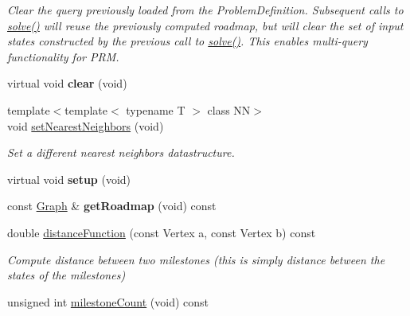 \begin{DoxyCompactItemize}
\begin{DoxyCompactList}\small\item\em \-Clear the query previously loaded from the \-Problem\-Definition. \-Subsequent calls to \hyperlink{class_f_i_r_m_a02f3c98de4840594193ba5bf7ff3ca63}{solve()} will reuse the previously computed roadmap, but will clear the set of input states constructed by the previous call to \hyperlink{class_f_i_r_m_a02f3c98de4840594193ba5bf7ff3ca63}{solve()}. \-This enables multi-\/query functionality for \-P\-R\-M. \end{DoxyCompactList}\item 
\hypertarget{class_f_i_r_m_afe5298e85713c7a736d6b8936f7171af}{virtual void {\bfseries clear} (void)}\label{class_f_i_r_m_afe5298e85713c7a736d6b8936f7171af}

\item 
\hypertarget{class_f_i_r_m_a8dd7c5ed3fa065f5f37d79bc1d220474}{{\footnotesize template$<$template$<$ typename T $>$ class \-N\-N$>$ }\\void \hyperlink{class_f_i_r_m_a8dd7c5ed3fa065f5f37d79bc1d220474}{set\-Nearest\-Neighbors} (void)}\label{class_f_i_r_m_a8dd7c5ed3fa065f5f37d79bc1d220474}

\begin{DoxyCompactList}\small\item\em \-Set a different nearest neighbors datastructure. \end{DoxyCompactList}\item 
\hypertarget{class_f_i_r_m_a78c43a180deb28296e4cab5c6939c600}{virtual void {\bfseries setup} (void)}\label{class_f_i_r_m_a78c43a180deb28296e4cab5c6939c600}

\item 
\hypertarget{class_f_i_r_m_aacad0b0dfc1413f78c6dc76fdbac9ce7}{const \hyperlink{class_f_i_r_m_a687e9f4243b22c30ee1fa5da22a85053}{\-Graph} \& {\bfseries get\-Roadmap} (void) const }\label{class_f_i_r_m_aacad0b0dfc1413f78c6dc76fdbac9ce7}

\item 
\hypertarget{class_f_i_r_m_a9a98fdb0da781d77fe6ff9a55e8a7a34}{double \hyperlink{class_f_i_r_m_a9a98fdb0da781d77fe6ff9a55e8a7a34}{distance\-Function} (const \-Vertex a, const \-Vertex b) const }\label{class_f_i_r_m_a9a98fdb0da781d77fe6ff9a55e8a7a34}

\begin{DoxyCompactList}\small\item\em \-Compute distance between two milestones (this is simply distance between the states of the milestones) \end{DoxyCompactList}\item 
\hypertarget{class_f_i_r_m_a558fbb0135ab096d3cd06e65b88533de}{unsigned int \hyperlink{class_f_i_r_m_a558fbb0135ab096d3cd06e65b88533de}{milestone\-Count} (void) const }\label{class_f_i_r_m_a558fbb0135ab096d3cd06e65b88533de}


\end{DoxyCompactItemize}
